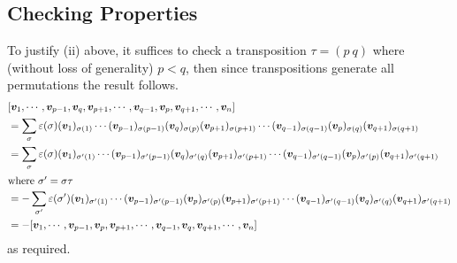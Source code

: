 \documentclass{article}
\begin{document}
\subsection{Checking Properties}
To justify (ii) above, it suffices to check a transposition $\tau = (p\ q)$ where (without loss of generality) $p < q$, then since transpositions generate all permutations the result follows.
\begin{align*}
	 & [\bm v_1, \cdots, \bm v_{p-1}, \bm v_q, \bm v_{p+1}, \cdots, \bm v_{q-1}, \bm v_p, \bm v_{q+1}, \cdots, \bm v_n]                                                                                                                          \\
	 & = \sum_\sigma \varepsilon(\sigma) (\bm v_1)_{\sigma(1)} \cdots (\bm v_{p-1})_{\sigma(p-1)}(\bm v_q)_{\sigma(p)}(\bm v_{p+1})_{\sigma(p+1)} \cdots (\bm v_{q-1})_{\sigma(q-1)}(\bm v_p)_{\sigma(q)}(\bm v_{q+1})_{\sigma(q+1)}             \\
	 & = \sum_\sigma \varepsilon(\sigma) (\bm v_1)_{\sigma'(1)} \cdots (\bm v_{p-1})_{\sigma'(p-1)}(\bm v_q)_{\sigma'(q)}(\bm v_{p+1})_{\sigma'(p+1)} \cdots (\bm v_{q-1})_{\sigma'(q-1)}(\bm v_p)_{\sigma'(p)}(\bm v_{q+1})_{\sigma'(q+1)}      \\
	\intertext{where $\sigma' = \sigma\tau$}
	 & = -\sum_{\sigma'} \varepsilon(\sigma') (\bm v_1)_{\sigma'(1)} \cdots (\bm v_{p-1})_{\sigma'(p-1)}(\bm v_p)_{\sigma'(p)}(\bm v_{p+1})_{\sigma'(p+1)} \cdots (\bm v_{q-1})_{\sigma'(q-1)}(\bm v_q)_{\sigma'(q)}(\bm v_{q+1})_{\sigma'(q+1)} \\
	 & = -[\bm v_1, \cdots, \bm v_{p-1}, \bm v_p, \bm v_{p+1}, \cdots, \bm v_{q-1}, \bm v_q, \bm v_{q+1}, \cdots, \bm v_n]
\end{align*}
as required.
\end{document}

